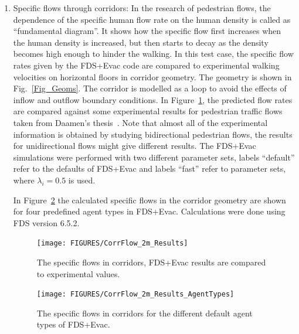 \documentclass[12pt,a4paper,final,twoside]{stylevk}
\begin{document}
%
\begin{enumerate}
%
\item Specific flows through corridors: In the research of pedestrian
  flows, the dependence of the specific human flow rate on the human
  density is called as ``fundamental diagram''.  It shows how the
  specific flow first increases when the human density is increased,
  but then starts to decay as the density becomes high enough to
  hinder the walking.  In this test case, the specific flow rates
  given by the FDS+Evac code are compared to experimental walking
  velocities on horizontal floors in corridor geometry.  The geometry
  is shown in Fig.~\ref{Fig_Geoms}.  The corridor is modelled as a
  loop to avoid the effects of inflow and outflow boundary conditions.
  In Figure~\ref{Fig_CorrResults}, the predicted flow rates are
  compared against some experimental results for pedestrian traffic
  flows taken from Daamen's thesis~\cite{Daamen04}.  Note that almost
  all of the experimental information is obtained by studying
  bidirectional pedestrian flows, the results for unidirectional flows
  might give different results.  The FDS+Evac simulations were
  performed with two different parameter sets, labels ``default''
  refer to the defaults of FDS+Evac and labels ``fast'' refer to
  parameter sets, where $\lambda_i = 0.5$ is used.

  In Figure~\ref{Fig_CorrResultsAgentTypes} the calculated specific
  flows in the corridor geometry are shown for four predefined
  agent types in FDS+Evac.  Calculations were done using FDS version 6.5.2.

%
\begin{figure}[!tb]
  \centerline{\texttt{[image: FIGURES/CorrFlow\_2m\_Results]}} 
  \caption{The specific flows in corridors, FDS+Evac results are
    compared to experimental values.}\label{Fig_CorrResults} 
\end{figure}
%

%
\begin{figure}[!tb]
  \centerline{\texttt{[image: FIGURES/CorrFlow\_2m\_Results\_AgentTypes]}} 
  \caption{The specific flows in corridors for the different default
    agent types of FDS+Evac.}\label{Fig_CorrResultsAgentTypes} 
\end{figure}
%


\end{enumerate}
\end{document}
